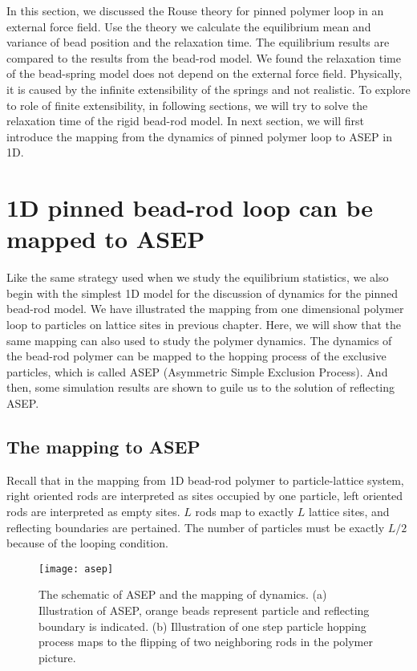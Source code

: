 In this section, we discussed the Rouse theory for pinned polymer loop in an external force field. Use the theory we calculate the equilibrium mean and variance of bead position and the relaxation time. The equilibrium results are compared to the results from the bead-rod model. We found the relaxation time of the bead-spring model does not depend on the external force field. Physically, it is caused by the infinite extensibility of the springs and not realistic. To explore to role of finite extensibility, in following sections, we will try to solve the relaxation time of the rigid bead-rod model. In next section, we will first introduce the mapping from the dynamics of pinned polymer loop to ASEP in 1D. 


\section{1D pinned bead-rod loop can be mapped to ASEP}
\label{sec:1d_pinned_bead_rod_loop_maps_to_asep}
Like the same strategy used when we study the equilibrium statistics, we also begin with the simplest 1D model for the discussion of dynamics for the pinned bead-rod model. We have illustrated the mapping from one dimensional polymer loop to particles on lattice sites in previous chapter. Here, we will show that the same mapping can also used to study the polymer dynamics. The dynamics of the bead-rod polymer can be mapped to the hopping process of the exclusive particles, which is called ASEP (Asymmetric Simple Exclusion Process). And then, some simulation results are shown to guile us to the solution of reflecting ASEP.

\subsection{The mapping to ASEP}
\label{sub:the_mapping_to_asep}
Recall that in the mapping from 1D bead-rod polymer to particle-lattice system, right oriented rods are interpreted as sites occupied by one particle, left oriented rods are interpreted as empty sites. $L$ rods map to exactly $L$ lattice sites, and reflecting boundaries are pertained. The number of particles must be exactly $L/2$ because of the looping condition. 

\begin{figure}[htpb]
    \centering
    \texttt{[image: asep]}
    \caption{The schematic of ASEP and the mapping of dynamics. (a) Illustration of ASEP, orange beads represent particle and reflecting boundary is indicated. (b) Illustration of one step particle hopping process maps to the flipping of two neighboring rods in the polymer picture. }
    \label{fig:asep}
\end{figure}

